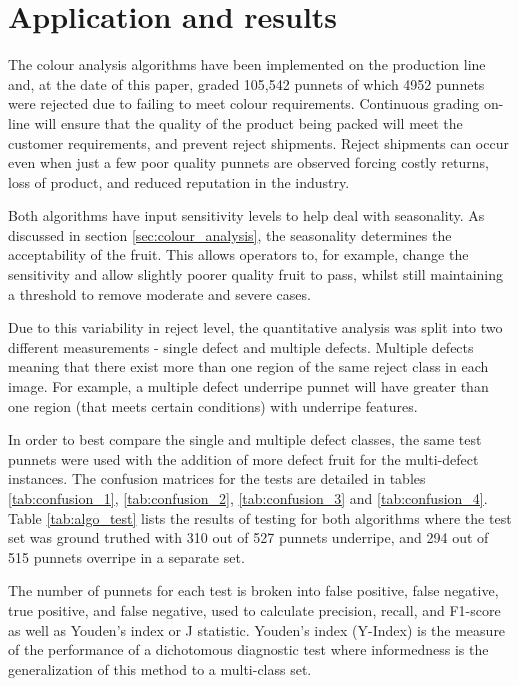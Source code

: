 \documentclass{bmvc2k}
\begin{document}

\section{Application and results}

The colour analysis algorithms have been implemented on the production line and, at the date of this paper, graded 105,542 punnets of which 4952 punnets were rejected due to failing to meet colour requirements. Continuous grading on-line will ensure that the quality of the product being packed will meet the customer requirements, and prevent reject shipments. Reject shipments can occur even when just a few poor quality punnets are observed forcing costly returns, loss of product, and reduced reputation in the industry.

Both algorithms have input sensitivity levels to help deal with seasonality. As discussed in section \ref{sec:colour_analysis}, the seasonality determines the acceptability of the fruit. This allows operators to, for example, change the sensitivity and allow slightly poorer quality fruit to pass, whilst still maintaining a threshold to remove moderate and severe cases.

Due to this variability in reject level, the quantitative analysis was split into two different measurements - single defect and multiple defects. Multiple defects meaning that there exist more than one region of the same reject class in each image. For example, a multiple defect underripe punnet will have greater than one region (that meets certain conditions) with underripe features.

In order to best compare the single and multiple defect classes, the same test punnets were used with the addition of more defect fruit for the multi-defect instances. The confusion matrices for the tests are detailed in tables \ref{tab:confusion_1},  \ref{tab:confusion_2}, \ref{tab:confusion_3} and \ref{tab:confusion_4}. Table \ref{tab:algo_test} lists the results of testing for both algorithms where the test set was ground truthed with 310 out of 527 punnets underripe, and 294 out of 515 punnets overripe in a separate set.

The number of punnets for each test is broken into false positive, false negative, true positive, and false negative, used to calculate precision, recall, and F1-score as well as Youden's index or J statistic. Youden's index (Y-Index) is the measure of the performance of a dichotomous diagnostic test where informedness is the generalization of this method to a multi-class set.
\end{document}
